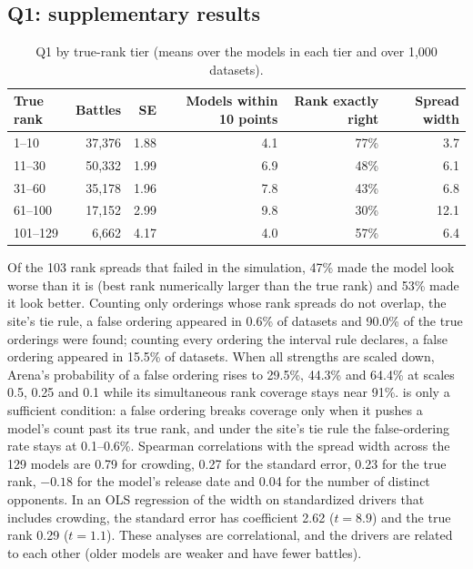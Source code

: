 \documentclass[12pt]{article}
\begin{document}
\FloatBarrier
\subsection{Q1: supplementary results}\label{app:q1}

\begin{table}[!ht]
\centering\small
\caption{Q1 by true-rank tier (means over the models in each tier and over 1,000 datasets).}\label{tab:q1tiers}
\begin{tabular}{@{}lrrrrr@{}}
\toprule
True rank & Battles & SE & Models within 10 points & Rank exactly right & Spread width \\
\midrule
1--10 & 37,376 & 1.88 & 4.1 & 77\% & 3.7 \\
11--30 & 50,332 & 1.99 & 6.9 & 48\% & 6.1 \\
31--60 & 35,178 & 1.96 & 7.8 & 43\% & 6.8 \\
61--100 & 17,152 & 2.99 & 9.8 & 30\% & 12.1 \\
101--129 & 6,662 & 4.17 & 4.0 & 57\% & 6.4 \\
\bottomrule
\end{tabular}
\end{table}

Of the 103 rank spreads that failed in the simulation, 47\% made the model look worse than it is (best rank numerically larger than the true rank) and 53\% made it look better. Counting only orderings whose rank spreads do not overlap, the site's tie rule, a false ordering appeared in 0.6\% of datasets and 90.0\% of the true orderings were found; counting every ordering the interval rule declares, a false ordering appeared in 15.5\% of datasets. When all strengths are scaled down, Arena's probability of a false ordering rises to 29.5\%, 44.3\% and 64.4\% at scales 0.5, 0.25 and 0.1 while its simultaneous rank coverage stays near 91\%.  is only a sufficient condition: a false ordering breaks coverage only when it pushes a model's count past its true rank, and under the site's tie rule the false-ordering rate stays at 0.1--0.6\%. Spearman correlations with the spread width across the 129 models are 0.79 for crowding, 0.27 for the standard error, 0.23 for the true rank, $-0.18$ for the model's release date and 0.04 for the number of distinct opponents. In an OLS regression of the width on standardized drivers that includes crowding, the standard error has coefficient 2.62 ($t = 8.9$) and the true rank 0.29 ($t = 1.1$). These analyses are correlational, and the drivers are related to each other (older models are weaker and have fewer battles).
\end{document}
